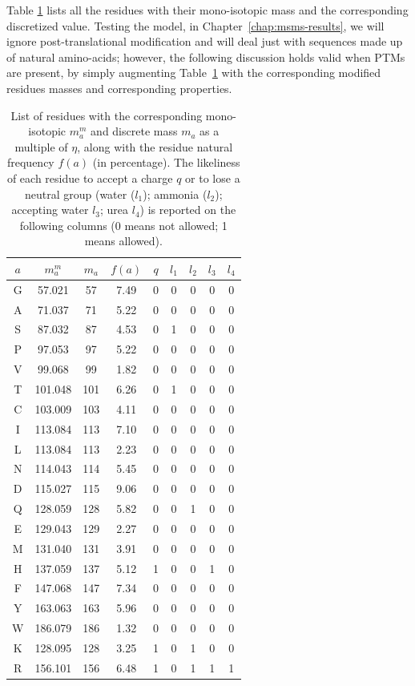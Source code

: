 Table \ref{tab:residues} lists  all the residues with their mono-isotopic mass and the corresponding 
discretized value. Testing the model, in Chapter~\ref{chap:msms-results}, we will ignore
post-translational modification and will deal just with sequences made up of
natural amino-acids; however, the following discussion holds valid when PTMs are
present, by simply augmenting Table~\ref{tab:residues} with the corresponding modified
residues masses and corresponding properties.

\begin{table}
\centering
\begin{tabular}{ccccccccc}
\hline \hline
$a$ & $m^m_{a}$ & $m_{a}$ & $f(a)$ & $q$ & $l_1$ & $l_2$ & $l_3$ & $l_4$\\
\hline	
G &  57.021 &  57 & 7.49 & 0 & 0 & 0 & 0 & 0 \\
A &  71.037 &  71 & 5.22 & 0 & 0 & 0 & 0 & 0 \\
S &  87.032 &  87 & 4.53 & 0 & 1 & 0 & 0 & 0 \\
P &  97.053 &  97 & 5.22 & 0 & 0 & 0 & 0 & 0 \\
V &  99.068 &  99 & 1.82 & 0 & 0 & 0 & 0 & 0 \\
T & 101.048 & 101 & 6.26 & 0 & 1 & 0 & 0 & 0 \\
C & 103.009 & 103 & 4.11 & 0 & 0 & 0 & 0 & 0 \\
I & 113.084 & 113 & 7.10 & 0 & 0 & 0 & 0 & 0 \\
L & 113.084 & 113 & 2.23 & 0 & 0 & 0 & 0 & 0 \\
N & 114.043 & 114 & 5.45 & 0 & 0 & 0 & 0 & 0 \\
D & 115.027 & 115 & 9.06 & 0 & 0 & 0 & 0 & 0 \\
Q & 128.059 & 128 & 5.82 & 0 & 0 & 1 & 0 & 0 \\
E & 129.043 & 129 & 2.27 & 0 & 0 & 0 & 0 & 0 \\
M & 131.040 & 131 & 3.91 & 0 & 0 & 0 & 0 & 0 \\
H & 137.059 & 137 & 5.12 & 1 & 0 & 0 & 1 & 0 \\
F & 147.068 & 147 & 7.34 & 0 & 0 & 0 & 0 & 0 \\
Y & 163.063 & 163 & 5.96 & 0 & 0 & 0 & 0 & 0 \\
W & 186.079 & 186 & 1.32 & 0 & 0 & 0 & 0 & 0 \\
K & 128.095 & 128 & 3.25 & 1 & 0 & 1 & 0 & 0 \\
R & 156.101 & 156 & 6.48 & 1 & 0 & 1 & 1 & 1 \\
\hline \hline
\end{tabular}
\caption{\label{tab:residues} List of residues with the corresponding
mono-isotopic $m^m_{a}$ and discrete mass $m_{a}$ as a multiple of $\eta$,
along with the residue natural frequency $f(a)$ (in percentage). 
The likeliness of each residue to accept a charge $q$ or to lose a neutral group
(water ($l_1$); ammonia ($l_2$); accepting water $l_3$; urea $l_4$) is reported
on the following columns (0 means not allowed; 1 means allowed).}
\end{table}

